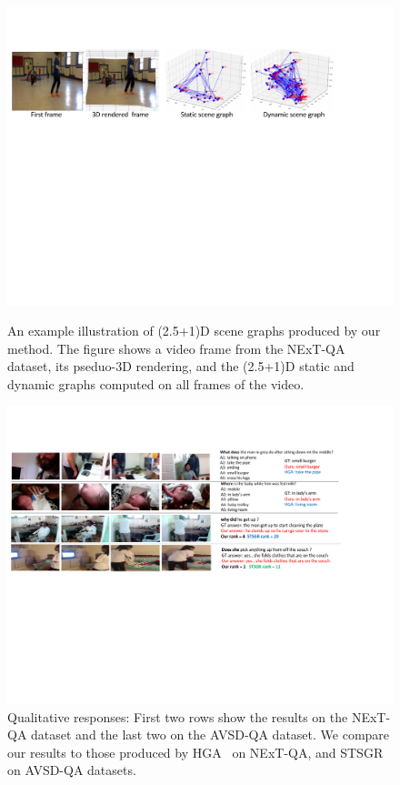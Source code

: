\documentclass[letterpaper]{article} %
\begin{document}
\begin{figure}[h]
    \centering
    \includegraphics[width=14.5cm,trim={0cm 13.5cm 3.5cm 3cm},clip]{./figs/quals_paper_1.pdf}
    \caption{An example illustration of (2.5+1)D scene graphs produced by our method. The figure shows a video frame from the NExT-QA dataset, its pseduo-3D rendering, and the (2.5+1)D static and dynamic graphs computed on all frames of the video.}
    \label{fig:next-qa-more-quals}
    \centering
     \includegraphics[width=14.5cm,trim={0.5cm 9cm 3.5cm 3cm},clip]{./figs/quals_paper_2.pdf}
    \caption{Qualitative responses: First two rows show the results on the NExT-QA dataset and the last two on the AVSD-QA dataset. We compare our results to those produced by HGA~\cite{fan2019heterogeneous} on NExT-QA, and STSGR~\cite{geng2021dynamic} on AVSD-QA datasets. }
    \label{fig:quals}
\end{figure}
\end{document}
